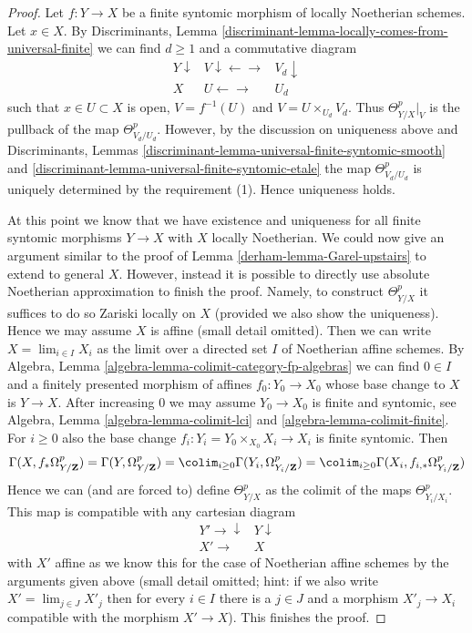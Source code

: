 \begin{proof}
\medskip\noindent
Let $f : Y \to X$ be a finite syntomic morphism of locally Noetherian schemes.
Let $x \in X$. By Discriminants, Lemma
\ref{discriminant-lemma-locally-comes-from-universal-finite}
we can find $d \geq 1$ and a commutative diagram
$$
\begin{array}{ccc}Y \downarrow & V \downarrow\longleftarrow\longrightarrow & V_d \downarrow \\ X & U \longleftarrow\longrightarrow & U_d\end{array}
$$
such that $x \in U \subset X$ is open, $V = f^{-1}(U)$
and $V = U \times_{U_d} V_d$. Thus $\Theta^p_{Y/X}|_V$
is the pullback of the map $\Theta^p_{V_d/U_d}$.
However, by the discussion on uniqueness above and
Discriminants, Lemmas
\ref{discriminant-lemma-universal-finite-syntomic-smooth} and
\ref{discriminant-lemma-universal-finite-syntomic-etale}
the map $\Theta^p_{V_d/U_d}$ is uniquely determined
by the requirement (1). Hence uniqueness holds.

\medskip\noindent
At this point we know that we have existence and uniqueness
for all finite syntomic morphisms $Y \to X$ with $X$ locally Noetherian.
We could now give an argument similar to the proof of
Lemma \ref{derham-lemma-Garel-upstairs} to extend to general $X$.
However, instead it is possible to directly use
absolute Noetherian approximation to finish the proof.
Namely, to construct $\Theta^p_{Y/X}$
it suffices to do so Zariski locally on $X$ (provided we also
show the uniqueness). Hence we may assume $X$ is affine (small
detail omitted). Then we can write $X = \lim_{i \in I} X_i$
as the limit over a directed set $I$ of Noetherian affine schemes.
By Algebra, Lemma \ref{algebra-lemma-colimit-category-fp-algebras}
we can find $0 \in I$ and a finitely
presented morphism of affines $f_0 : Y_0 \to X_0$ whose base change to
$X$ is $Y \to X$. After increasing $0$ we may assume $Y_0 \to X_0$
is finite and syntomic, see
Algebra, Lemma \ref{algebra-lemma-colimit-lci} and
\ref{algebra-lemma-colimit-finite}. For $i \geq 0$ also the
base change $f_i : Y_i = Y_0 \times_{X_0} X_i \to X_i$ is finite syntomic.
Then
$$
\Gamma(X, f_*\Omega^p_{Y/\mathbf{Z}}) =
\Gamma(Y, \Omega^p_{Y/\mathbf{Z}}) =
\colim_{i \geq 0} \Gamma(Y_i, \Omega^p_{Y_i/\mathbf{Z}}) =
\colim_{i \geq 0} \Gamma(X_i, f_{i, *}\Omega^p_{Y_i/\mathbf{Z}})
$$
Hence we can (and are forced to) define $\Theta^p_{Y/X}$ as the colimit
of the maps $\Theta^p_{Y_i/X_i}$. This map is compatible with any
cartesian diagram
$$
\begin{array}{cc}Y' \longrightarrow\downarrow & Y \downarrow \\ X' \longrightarrow & X\end{array}
$$
with $X'$ affine as we know this for the case of Noetherian affine schemes
by the arguments given above (small detail omitted; hint: if we also
write $X' = \lim_{j \in J} X'_j$ then for every $i \in I$ there is a $j \in J$
and a morphism $X'_j \to X_i$ compatible with the morphism $X' \to X$).
This finishes the proof.
\end{proof}

